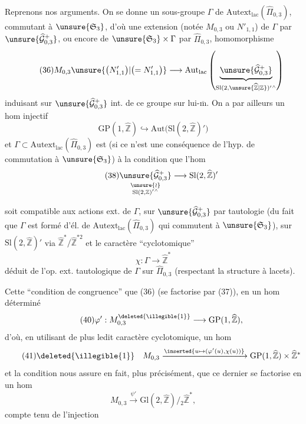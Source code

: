 Reprenons nos arguments. On se donne un sous-groupe $\Gamma$ de
$\mathrm{Autext}_{\mathrm{lac}}(\widehat{\Pi}_{0,3})$, commutant à
$\unsure{\mathfrak S_3}$, d'où une extension 
(notée $M_{0,3}$ ou $N'_{1,1}$) de $\Gamma$ par
$\unsure{\widehat{\mathcal G}_{0,3}^{+}}$, ou encore de
$\unsure{\mathfrak S_3}\times\Gamma$ par $\widehat{\Pi}_{0,3}$,
 homomorphisme
\[
\tag{36}
M_{0,3}\unsure{\bigl(N'_{1,1}\bigr)|\bigl(=N'_{1,1}\bigr)}\longrightarrow
\mathrm{Aut}_{\mathrm{lac}}\left(
\underbrace{\unsure{\widehat{\mathcal G}_{0,3}^{+}}}_{\mathrm{Sl}(2,\unsure{\widehat{\mathbb Z}|\mathbb Z})'{}^{\wedge}}
\right)
\]
induisant sur $\unsure{\widehat{\mathcal G}_{0,3}^{+}}$
int. de ce groupe sur lui-$\overline{\mathrm m}$.
On a par ailleurs un hom injectif
\[
\tag{37}
\mathrm{GP}(1,\widehat{\mathbb Z})\hookrightarrow
\mathrm{Aut}\bigl(\mathrm{Sl}(2,\widehat{\mathbb Z})'\bigr)
\]
et $\Gamma\subset\mathrm{Autext}_{\mathrm{lac}}(\widehat{\Pi}_{0,3})$ est
 (si ce n'est  une conséquence de l'hyp. de commutation à
$\unsure{\mathfrak S_3}$) à la condition que l'hom
\[
\tag{38}
\underset{\substack{\unsure{\wr}\\\mathrm{Sl}(2,\mathbb Z)'{}^{\wedge}}}{\unsure{\widehat{\mathcal G}_{0,3}^{+}}}
\longrightarrow\mathrm{Sl}(2,\widehat{\mathbb Z})'
\]



soit compatible aux actions ext. de $\Gamma$, sur
$\unsure{\widehat{\mathcal G}_{0,3}^{+}}$ par tautologie (du fait que $\Gamma$ est formé
d'él. de $\mathrm{Autext}_{\mathrm{lac}}(\widehat{\Pi}_{0,3})$ qui commutent à
$\unsure{\mathfrak S_3}$), sur $\mathrm{Sl}(2,\widehat{\mathbb Z})'$ via
$\widehat{\mathbb Z}^{*}/\widehat{\mathbb Z}^{*2}$ et le caractère ``cyclotomique''
\[
\tag{39}
\chi:\Gamma\longrightarrow\widehat{\mathbb Z}^{*}
\]
déduit de l'op. ext. tautologique de $\Gamma$ sur $\widehat{\Pi}_{0,3}$
(respectant la structure à lacets).

Cette ``condition de congruence'' 
  que (36)
(se factorise par (37)), en un hom  déterminé
\[
\tag{40}
\varphi':M_{0,3}^{\deleted{\illegible{1}}}\longrightarrow\mathrm{GP}(1,\widehat{\mathbb Z}),
\]
d'où, en utilisant de plus ledit caractère cyclotomique, un hom
\[
\tag{41}
\deleted{\illegible{1}}\quad M_{0,3}
\xrightarrow{\inserted{u\mapsto(\varphi'(u),\chi(u))}}
\mathrm{GP}(1,\widehat{\mathbb Z})\times\widehat{\mathbb Z}^{*}
\]
et la condition  nous assure en fait, plus précisément, que ce dernier
se factorise en un hom
\[
\tag{42}
M_{0,3}\xrightarrow{\psi'}\mathrm{Gl}(2,\widehat{\mathbb Z})/{}_{2}\widehat{\mathbb Z}^{*},
\]
compte tenu de l'injection

